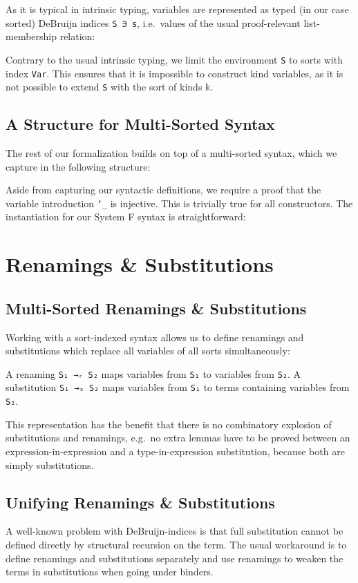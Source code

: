 \documentclass[sigplan,10pt]{acmart}
\newenvironment{LibCode*}{%
  \begin{tcolorbox}[%
    colframe=white,%
    boxrule=0.0pt,%
    top=2.5pt,%
    left=2.5pt,%
    bottom=2.5pt,%
    right=2.5pt,%
    boxsep=0pt%
  ]\vspace{-0.2\baselineskip}%
}{%
  \vspace{-1\baselineskip}%
  \end{tcolorbox}%
}
\newenvironment{ExampleCode*}{%
  \begin{tcolorbox}[%
    colframe=white,%
    colback=yellow!5,%
    boxrule=0.0pt,%
    top=2.5pt,%
    left=2.5pt,%
    bottom=2.5pt,%
    right=2.5pt,%
    boxsep=0pt%
  ]\vspace{-0.2\baselineskip}%
}{%
  \vspace{-1\baselineskip}%
  \end{tcolorbox}%
}
\newcommand*\LibCode[1]{\begin{LibCode*}{#1}\end{LibCode*}}
\newcommand*\AppCode[1]{{#1}}
\newcommand*\ExampleCode[1]{\begin{ExampleCode*}{#1}\end{ExampleCode*}}
\begin{document}
  As it is typical in intrinsic typing, variables are represented as
  typed (in our case sorted) DeBruijn indices \texttt{S~∋~s}, i.e.\
  values of the usual proof-relevant list-membership relation:
  \LibCode\KVariables

  Contrary to the usual intrinsic typing, we limit the environment
  \texttt{S} to sorts with index \texttt{Var}.
  This ensures that it is impossible to construct kind variables, as
  it is not possible to extend \texttt{S} with the sort of kinds
  \texttt{𝕜}.

  \subsection{A Structure for Multi-Sorted Syntax}
  The rest of our formalization builds on top of a multi-sorted
  syntax, which we capture in the following structure:
  \LibCode\KTerms
  Aside from capturing our syntactic definitions, we require a proof that the
  variable introduction \texttt{`\_} is injective. This is trivially true
  for all constructors. The instantiation for our System F syntax is straightforward:
  \AppCode\FTerms

  \section{Renamings \& Substitutions}
  \subsection{Multi-Sorted Renamings \& Substitutions}
  Working with a sort-indexed syntax allows us to define renamings and substitutions
  which replace all variables of all sorts simultaneously:

  \ExampleCode\FExampleSubRen

  A renaming \texttt{S₁ →ᵣ S₂} maps variables from \texttt{S₁} to
  variables from \texttt{S₂}.
  A substitution \texttt{S₁ →ₛ S₂} maps variables from \texttt{S₁} to
  terms containing variables from \texttt{S₂}.

  \ExampleCode\FExampleSub

  This representation has the benefit that there is no combinatory
  explosion of substitutions and renamings, e.g.\ no extra lemmas have to be
  proved between an expression-in-expression and a type-in-expression
  substitution, because both are simply substitutions.

  \subsection{Unifying Renamings \& Substitutions}
  A well-known problem with DeBruijn-indices is that full substitution
  cannot be defined directly by structural recursion on the term.
  The usual workaround is to define renamings and substitutions
  separately and use renamings to weaken the terms in substitutions
  when going under binders. 
\end{document}
